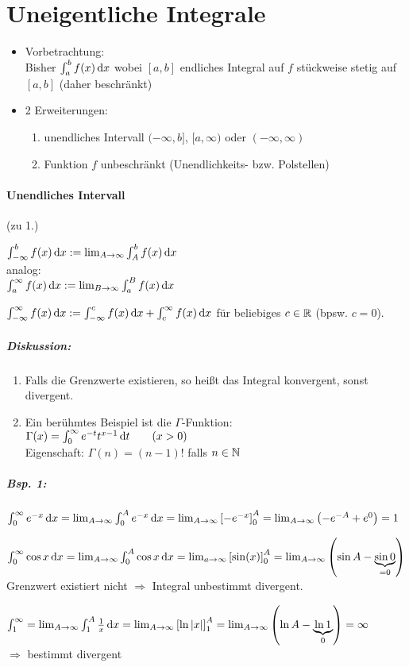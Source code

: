 \section{Uneigentliche Integrale}
\begin{itemize}
\item Vorbetrachtung:\\
Bisher $\int_a^b f(x) \,\mathrm{d}x$ wobei $[a,b]$ endliches Integral auf $f$ stückweise stetig auf $[a,b]$ (daher beschränkt)
\item 2 Erweiterungen:
\begin{enumerate}
\item unendliches Intervall $(-\infty, b]$, $[a,\infty)$ oder $(-\infty, \infty)$
\item Funktion $f$ unbeschränkt (Unendlichkeits- bzw. Polstellen)
\end{enumerate}
\end{itemize}
\paragraph{Unendliches Intervall} (zu 1.)
\begin{anumerate}
\item $\int_{-\infty}^b f(x) \,\mathrm{d}x:= \lim_{A\to \infty} \int_A^b f(x) \,\mathrm{d}x$\\
analog:\\
$\int_a^{\infty} f(x) \,\mathrm{d}x := \lim_{B \to \infty} \int_a^{B} f(x) \,\mathrm{d}x$
\item $\int_{-\infty}^{\infty} f(x) \,\mathrm{d}x := \int_{-\infty}^c f(x) \,\mathrm{d}x + \int_c^{\infty} f(x) \,\mathrm{d}x$ für beliebiges $c \in \mathbb{R}$ (bpsw. $c=0$).
\end{anumerate}
\subparagraph{Diskussion:}
\begin{enumerate}
\item Falls die Grenzwerte existieren, so heißt das Integral konvergent, sonst divergent.
\item Ein berühmtes Beispiel ist die $\Gamma$-Funktion:\\
$\Gamma (x) = \int_0^{\infty} e^{-t} t^{x-1} \,\mathrm{d}t \qquad (x >0 )$\\
Eigenschaft: $\Gamma (n) = (n-1)!$ falls $n \in \mathbb{N}$
\end{enumerate}
\subparagraph{Bsp. 1:} 
\begin{anumerate}
\item $\int_0^{\infty} e^{-x} \,\mathrm{d}x = \lim_{A \to \infty} \int_0^A e^{-x} \,\mathrm{d}x = \lim_{A \to \infty} \left[ -e^{-x}\right]_0^A = \lim_{A \to \infty} \left( -e^{-A}+e^0\right) =1$
\item $\int_0^{\infty} \cos x \,\mathrm{d}x= \lim_{A\to \infty} \int_0^A \cos x \,\mathrm{d}x = \lim_{a\to \infty} \left[ \sin (x) \right]_0^A = \lim_{A\to \infty} \left( \sin A - \underbrace{\sin 0}_{=0}\right)$\\
Grenzwert existiert nicht $\Rightarrow$ Integral unbestimmt divergent.
\item $\int_1^{\infty} = \lim_{A\to \infty} \int_1^A \frac{1}{x} \,\mathrm{d}x = \lim_{A\to \infty} \left[ \ln | x| \right]_1^A = \lim_{A\to \infty} \left( \ln A - \underbrace{\ln 1}_{0}\right) = \infty$\\
$\Rightarrow$ bestimmt divergent
\end{anumerate}
